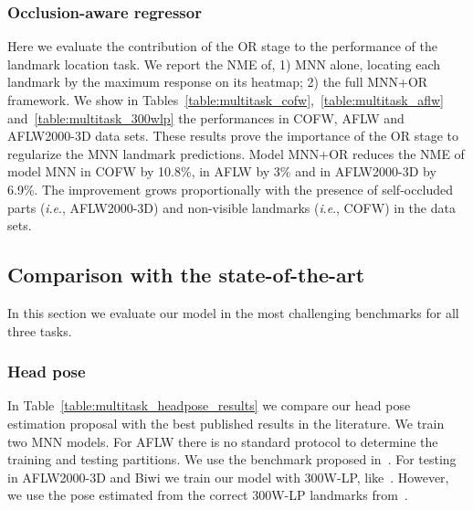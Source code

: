 \documentclass[9pt,technote,compsoc]{IEEEtran}
\newcommand{\ie}{\textit{i}.\textit{e}., }
\begin{document}
\subsubsection{Occlusion-aware regressor}

Here we evaluate the contribution of the OR stage to the performance of the landmark location task. We report the \textrm{NME} of, 1) MNN alone, locating each landmark by the maximum response on its heatmap; 2) the full MNN+OR framework. We show in Tables~\ref{table:multitask_cofw},~\ref{table:multitask_aflw}  and~\ref{table:multitask_300wlp} the performances in COFW, AFLW and AFLW2000-3D data sets.
These results prove the importance of the OR stage to regularize the MNN landmark predictions. Model MNN+OR reduces the NME of model MNN in COFW by 10.8\%, in AFLW by 3\% and in AFLW2000-3D by 6.9\%. The improvement grows proportionally with the presence of self-occluded parts (\ie AFLW2000-3D) and non-visible landmarks (\ie COFW) in the data sets.

\subsection{Comparison with the state-of-the-art}
In this section we evaluate our model in the most challenging benchmarks for all three tasks.



\subsubsection{Head pose}

In Table~\ref{table:multitask_headpose_results} we compare our head pose estimation proposal with the best published results in the literature. We train two MNN models. For AFLW there is no standard protocol to determine the training and testing partitions. We use the benchmark proposed in~\cite{Amador17}. For testing in AFLW2000-3D and Biwi we train our model with 300W-LP, like~\cite{Ruiz18,Liu19b,Hsu18,Yang19,Zhang20}. However, we use the pose estimated from the correct 300W-LP landmarks from~\cite{Bulat17b}. 
\end{document}
